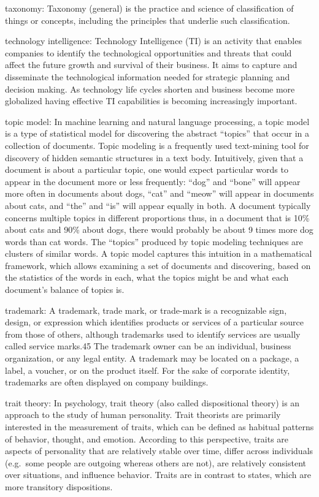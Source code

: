 \documentclass[]{book}
\begin{document}
taxonomy: Taxonomy (general) is the practice and science of
classification of things or concepts, including the principles that
underlie such classification.

technology intelligence: Technology Intelligence (TI) is an activity
that enables companies to identify the technological opportunities and
threats that could affect the future growth and survival of their
business. It aims to capture and disseminate the technological
information needed for strategic planning and decision making. As
technology life cycles shorten and business become more globalized
having effective TI capabilities is becoming increasingly important.

topic model: In machine learning and natural language processing, a
topic model is a type of statistical model for discovering the abstract
``topics'' that occur in a collection of documents. Topic modeling is a
frequently used text-mining tool for discovery of hidden semantic
structures in a text body. Intuitively, given that a document is about a
particular topic, one would expect particular words to appear in the
document more or less frequently: ``dog'' and ``bone'' will appear more
often in documents about dogs, ``cat'' and ``meow'' will appear in
documents about cats, and ``the'' and ``is'' will appear equally in
both. A document typically concerns multiple topics in different
proportions thus, in a document that is 10\% about cats and 90\% about
dogs, there would probably be about 9 times more dog words than cat
words. The ``topics'' produced by topic modeling techniques are clusters
of similar words. A topic model captures this intuition in a
mathematical framework, which allows examining a set of documents and
discovering, based on the statistics of the words in each, what the
topics might be and what each document's balance of topics is.

trademark: A trademark, trade mark, or trade-mark is a recognizable
sign, design, or expression which identifies products or services of a
particular source from those of others, although trademarks used to
identify services are usually called service marks.45 The trademark
owner can be an individual, business organization, or any legal entity.
A trademark may be located on a package, a label, a voucher, or on the
product itself. For the sake of corporate identity, trademarks are often
displayed on company buildings.

trait theory: In psychology, trait theory (also called dispositional
theory) is an approach to the study of human personality. Trait
theorists are primarily interested in the measurement of traits, which
can be defined as habitual patterns of behavior, thought, and emotion.
According to this perspective, traits are aspects of personality that
are relatively stable over time, differ across individuals (e.g.~some
people are outgoing whereas others are not), are relatively consistent
over situations, and influence behavior. Traits are in contrast to
states, which are more transitory dispositions.
\end{document}

